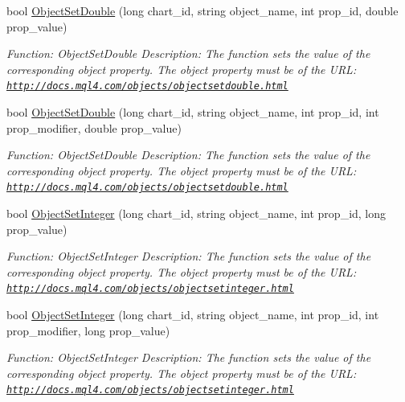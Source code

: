 \begin{DoxyCompactItemize}
bool \hyperlink{class_m_q_l4_c_sharp_1_1_base_1_1_m_q_l_base_a2c944cd96ba05f0e491c4a5a8dff65ae}{Object\+Set\+Double} (long chart\+\_\+id, string object\+\_\+name, int prop\+\_\+id, double prop\+\_\+value)
\begin{DoxyCompactList}\small\item\em Function\+: Object\+Set\+Double Description\+: The function sets the value of the corresponding object property. The object property must be of the U\+RL\+: \href{http://docs.mql4.com/objects/objectsetdouble.html}{\tt http\+://docs.\+mql4.\+com/objects/objectsetdouble.\+html} \end{DoxyCompactList}\item 
bool \hyperlink{class_m_q_l4_c_sharp_1_1_base_1_1_m_q_l_base_a95548b871eac346bbd40c138a7d53f0a}{Object\+Set\+Double} (long chart\+\_\+id, string object\+\_\+name, int prop\+\_\+id, int prop\+\_\+modifier, double prop\+\_\+value)
\begin{DoxyCompactList}\small\item\em Function\+: Object\+Set\+Double Description\+: The function sets the value of the corresponding object property. The object property must be of the U\+RL\+: \href{http://docs.mql4.com/objects/objectsetdouble.html}{\tt http\+://docs.\+mql4.\+com/objects/objectsetdouble.\+html} \end{DoxyCompactList}\item 
bool \hyperlink{class_m_q_l4_c_sharp_1_1_base_1_1_m_q_l_base_af10bc2ab785d291f532fff35a5feef91}{Object\+Set\+Integer} (long chart\+\_\+id, string object\+\_\+name, int prop\+\_\+id, long prop\+\_\+value)
\begin{DoxyCompactList}\small\item\em Function\+: Object\+Set\+Integer Description\+: The function sets the value of the corresponding object property. The object property must be of the U\+RL\+: \href{http://docs.mql4.com/objects/objectsetinteger.html}{\tt http\+://docs.\+mql4.\+com/objects/objectsetinteger.\+html} \end{DoxyCompactList}\item 
bool \hyperlink{class_m_q_l4_c_sharp_1_1_base_1_1_m_q_l_base_a16f72f4eab8b65cc4378fba7b9b463bb}{Object\+Set\+Integer} (long chart\+\_\+id, string object\+\_\+name, int prop\+\_\+id, int prop\+\_\+modifier, long prop\+\_\+value)
\begin{DoxyCompactList}\small\item\em Function\+: Object\+Set\+Integer Description\+: The function sets the value of the corresponding object property. The object property must be of the U\+RL\+: \href{http://docs.mql4.com/objects/objectsetinteger.html}{\tt http\+://docs.\+mql4.\+com/objects/objectsetinteger.\+html} \end{DoxyCompactList}\item 

\end{DoxyCompactItemize}

